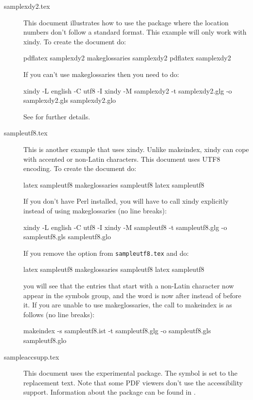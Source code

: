 \documentclass{nlctdoc}
\begin{document}
\begin{description}
\item[samplexdy2.tex]\label{ex:samplexdy2} This document illustrates
how to use the  package where the location
numbers don't follow a standard format. This example will only work
with \gls{xindy}. To create the document do:
\begin{prompt}
pdflatex samplexdy2
makeglossaries samplexdy2
pdflatex samplexdy2
\end{prompt}
If you can't use \gls{makeglossaries} then you need to do:
\begin{prompt}
xindy -L english -C utf8 -I xindy -M samplexdy2 -t samplexdy2.glg -o samplexdy2.gls samplexdy2.glo
\end{prompt}
See  for further details.

\item[sampleutf8.tex]\label{ex:sampleutf8} This is another example
that uses \gls{xindy}. Unlike \gls{makeindex},
\gls{xindy} can cope with accented or non-Latin characters. This
document uses UTF8 encoding. To create the document do:
\begin{prompt}
latex sampleutf8
makeglossaries sampleutf8
latex sampleutf8
\end{prompt}
If you don't have Perl installed, you will have to call
\gls{xindy} explicitly instead of using \gls{makeglossaries}
(no line breaks):
\begin{prompt}
xindy -L english -C utf8 -I xindy -M sampleutf8 -t sampleutf8.glg -o sampleutf8.gls sampleutf8.glo
\end{prompt}

If you remove the  option from \texttt{sampleutf8.tex} 
and do:
\begin{prompt}
latex sampleutf8
makeglossaries sampleutf8
latex sampleutf8
\end{prompt}
you will see that the entries that start with a non-Latin character
now appear in the symbols group, and the word  is now 
after  instead of before it. If you are unable to use
\gls{makeglossaries}, the call to \gls{makeindex} is as
follows (no line breaks):
\begin{prompt}
makeindex -s sampleutf8.ist -t sampleutf8.glg -o sampleutf8.gls sampleutf8.glo
\end{prompt}

\item[sampleaccsupp.tex]\label{ex:sampleaccsupp} This document
uses the experimental  package. The
symbol is set to the replacement text. Note that some PDF
viewers don't use the accessibility support. Information 
about the  package can be found in
.

\end{description}
\end{document}

